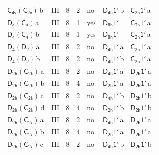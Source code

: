\documentclass[10pt,a4paper]{article}
\numberwithin{equation}{section}
\newcommand{\grp}[1]{\mathsf{#1}}
\newcommand{\clsletter}[1]{\,{\scriptsize\color{black!55}#1}}
\begin{document}
{\begin{longtable}{@{}llrrlll@{}}
\href{C4v-C2v.pdf}{$\grp{C_{4v}}(\grp{C_{2v}})$}\clsletter{b} & III & 8 & 2 & no & \href{D4h-1p.pdf}{$\grp{D_{4h}1'}$}\clsletter{b} & \href{C2h-1p.pdf}{$\grp{C_{2h}1'}$}\clsletter{a}\\
\href{D4-C4.pdf}{$\grp{D_{4}}(\grp{C_{4}})$}\clsletter{a} & III & 8 & 1 & yes & \href{D8h-1p.pdf}{$\grp{D_{8h}1'}$} & \href{C2h-1p.pdf}{$\grp{C_{2h}1'}$}\clsletter{a}\\
\href{D4-C4.pdf}{$\grp{D_{4}}(\grp{C_{4}})$}\clsletter{b} & III & 8 & 1 & yes & \href{D8h-1p.pdf}{$\grp{D_{8h}1'}$} & \href{C2h-1p.pdf}{$\grp{C_{2h}1'}$}\clsletter{a}\\
\href{D4-D2.pdf}{$\grp{D_{4}}(\grp{D_{2}})$}\clsletter{a} & III & 8 & 2 & no & \href{D4h-1p.pdf}{$\grp{D_{4h}1'}$}\clsletter{a} & \href{C2h-1p.pdf}{$\grp{C_{2h}1'}$}\clsletter{a}\\
\href{D4-D2.pdf}{$\grp{D_{4}}(\grp{D_{2}})$}\clsletter{b} & III & 8 & 2 & no & \href{D4h-1p.pdf}{$\grp{D_{4h}1'}$}\clsletter{b} & \href{C2h-1p.pdf}{$\grp{C_{2h}1'}$}\clsletter{a}\\
\href{D2h-C2h.pdf}{$\grp{D_{2h}}(\grp{C_{2h}})$}\clsletter{a} & III & 8 & 2 & no & \href{D4h-1p.pdf}{$\grp{D_{4h}1'}$}\clsletter{a} & \href{D2h-1p.pdf}{$\grp{D_{2h}1'}$}\clsletter{a}\\
\href{D2h-C2h.pdf}{$\grp{D_{2h}}(\grp{C_{2h}})$}\clsletter{b} & III & 8 & 4 & no & \href{D2h-1p.pdf}{$\grp{D_{2h}1'}$}\clsletter{a} & \href{D2h-1p.pdf}{$\grp{D_{2h}1'}$}\clsletter{a}\\
\href{D2h-C2h.pdf}{$\grp{D_{2h}}(\grp{C_{2h}})$}\clsletter{c} & III & 8 & 2 & no & \href{D4h-1p.pdf}{$\grp{D_{4h}1'}$}\clsletter{b} & \href{D2h-1p.pdf}{$\grp{D_{2h}1'}$}\clsletter{b}\\
\href{D2h-C2h.pdf}{$\grp{D_{2h}}(\grp{C_{2h}})$}\clsletter{d} & III & 8 & 4 & no & \href{D2h-1p.pdf}{$\grp{D_{2h}1'}$}\clsletter{b} & \href{D2h-1p.pdf}{$\grp{D_{2h}1'}$}\clsletter{b}\\
\href{D2h-C2v.pdf}{$\grp{D_{2h}}(\grp{C_{2v}})$}\clsletter{a} & III & 8 & 2 & no & \href{D4h-1p.pdf}{$\grp{D_{4h}1'}$}\clsletter{a} & \href{D2h-1p.pdf}{$\grp{D_{2h}1'}$}\clsletter{a}\\
\href{D2h-C2v.pdf}{$\grp{D_{2h}}(\grp{C_{2v}})$}\clsletter{b} & III & 8 & 4 & no & \href{D2h-1p.pdf}{$\grp{D_{2h}1'}$}\clsletter{a} & \href{D2h-1p.pdf}{$\grp{D_{2h}1'}$}\clsletter{a}\\
\href{D2h-C2v.pdf}{$\grp{D_{2h}}(\grp{C_{2v}})$}\clsletter{c} & III & 8 & 2 & no & \href{D4h-1p.pdf}{$\grp{D_{4h}1'}$}\clsletter{b} & \href{D2h-1p.pdf}{$\grp{D_{2h}1'}$}\clsletter{b}\\

\end{longtable}}
\end{document}

